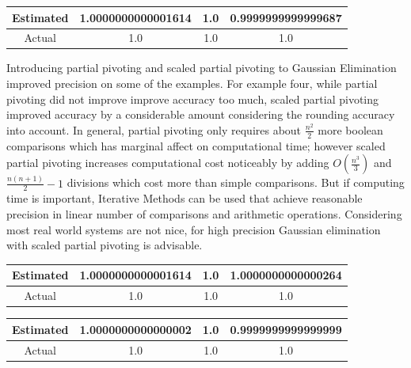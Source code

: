\documentclass[11pt]{article}	%
\begin{document}
\begin{center}
	 \label{tab:title}
    \begin{tabular}{||c|c|c|c||}
        \hline
        Estimated & 1.0000000000001614 & 1.0 &  0.9999999999999687 \\ [.25em]
        \hline\hline
        Actual & 1.0 & 1.0 & 1.0 \\ [.25em]
        \hline
    \end{tabular}
\end{center}

Introducing partial pivoting and scaled partial pivoting to Gaussian Elimination improved precision on some of the examples. For example four, while partial pivoting did not improve improve accuracy too much, scaled partial pivoting improved accuracy by a considerable amount considering the rounding accuracy into account. In general, partial pivoting only requires about $\frac{n^2}{2}$ more boolean comparisons which has marginal affect on computational time; however scaled partial pivoting increases computational cost noticeably by adding $O(\frac{n^3}{3})$ and $\frac{n(n+1)}{2} - 1$ divisions which cost more than simple comparisons. But if computing time is important, Iterative Methods can be used that achieve reasonable precision in linear number of comparisons and arithmetic operations. Considering most real world systems are not nice, for high precision Gaussian elimination with scaled partial pivoting is advisable.

\begin{center}
	 \label{tab:title}
    \begin{tabular}{||c|c|c|c||}
        \hline
        Estimated & 1.0000000000001614 & 1.0 &  1.0000000000000264 \\ [.25em]
        \hline\hline
        Actual & 1.0 & 1.0 & 1.0 \\ [.25em]
        \hline
    \end{tabular}
\end{center}

\begin{center}
	 \label{tab:title}
    \begin{tabular}{||c|c|c|c||}
        \hline
        Estimated & 1.0000000000000002 & 1.0 &  0.9999999999999999 \\ [.25em]
        \hline\hline
        Actual & 1.0 & 1.0 & 1.0 \\ [.25em]
        \hline
    \end{tabular}
\end{center}
\end{document}
